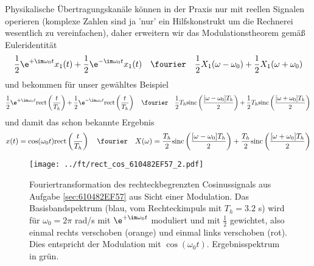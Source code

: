 \begin{ExCalc}
Physikalische Übertragungskanäle können in der Praxis nur mit reellen Signalen operieren
(komplexe Zahlen sind ja 'nur' ein Hilfskonstrukt um die Rechnerei wesentlich zu
vereinfachen), daher
erweitern wir das Modulationstheorem gemäß Euleridentität
\begin{equation}
  \frac{1}{2}\e^{+\im\omega_0 t} x_1(t) + \frac{1}{2}\e^{-\im\omega_0 t} x_1(t)
  \quad\fourier\quad
  \frac{1}{2}X_1(\omega-\omega_0) + \frac{1}{2}X_1(\omega+\omega_0)
\end{equation}
und bekommen für unser gewähltes Beispiel
\begin{equation}
  \frac{1}{2}\e^{+\im\omega_0 t} \mathrm{rect}\left(\frac{t}{T_h}\right) +
  \frac{1}{2}\e^{-\im\omega_0 t} \mathrm{rect}\left(\frac{t}{T_h}\right)
  \quad\fourier\quad
  \frac{1}{2}T_h \mathrm{sinc}\left(\frac{[\omega-\omega_0] T_h}{2}\right) +
  \frac{1}{2}T_h \mathrm{sinc}\left(\frac{[\omega+\omega_0] T_h}{2}\right)
\end{equation}
und damit das schon bekannte Ergebnis
\begin{equation}
  x(t) = \cos(\omega_0 t) \mathrm{rect}\left(\frac{t}{T_h}\right)
  \quad\fourier\quad
  X(\omega) = \frac{T_h}{2} \mathrm{sinc}\left(\frac{[\omega-\omega_0] T_h}{2}\right) +
  \frac{T_h}{2} \mathrm{sinc}\left(\frac{[\omega+\omega_0] T_h}{2}\right)
\end{equation}

\end{ExCalc}

\begin{figure}[h]
\centering
  \texttt{[image: ../ft/rect\_cos\_610482EF57\_2.pdf]}
  \caption{Fouriertransformation des rechteckbegrenzten Cosinussignals
  aus Aufgabe \ref{sec:610482EF57} aus Sicht einer Modulation.
  Das Basisbandspektrum (blau, vom Rechteckimpuls mit $T_h=3.2$ s)
  wird für $\omega_0=2\pi$ rad/s mit
  $\e^{+\im\omega_0 t}$ moduliert und mit $\frac{1}{2}$ gewichtet, also einmal
  rechts verschoben (orange) und einmal links verschoben (rot). Dies entspricht
  der Modulation mit $\cos(\omega_0 t)$. Ergebnisspektrum in grün.}
  \label{fig:rect_cos_610482EF57_2}
\end{figure}


